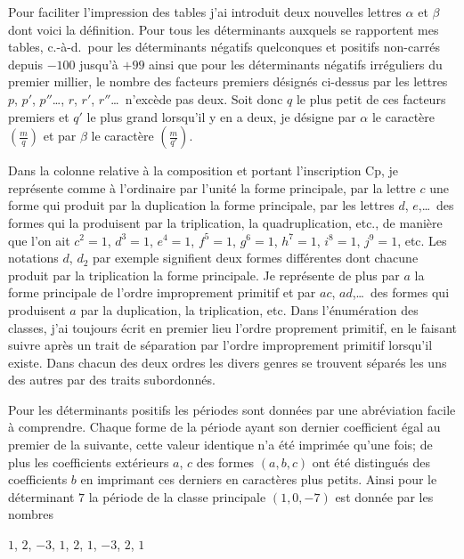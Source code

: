 \documentclass[11pt,a4paper]{article}
\begin{document}
Pour faciliter l'impression des tables j'ai introduit deux nouvelles lettres $\alpha$ et $\beta$ dont voici la d\'{e}finition. Pour tous les d\'{e}terminants auxquels se rapportent mes tables, c.-\`{a}-d.\ pour les d\'{e}terminants n\'{e}gatifs quelconques et positifs non-carr\'{e}s depuis $-100$ jusqu'\`{a} $+99$ ainsi que pour les d\'{e}terminants n\'{e}gatifs irr\'{e}guliers du premier millier, le nombre des facteurs premiers d\'{e}sign\'{e}s ci-dessus par les lettres $p$, $p'$, $p''$\ldots, $r$, $r'$, $r''$\ldots\ n'exc\`{e}de pas deux. Soit donc $q$ le plus petit de ces facteurs premiers et $q'$ le plus grand lorsqu'il y en a deux, je d\'{e}signe par $\alpha$ le caract\`{e}re $\left(\frac{m}{q}\right)$ et par $\beta$ le caract\`{e}re $\left(\frac{m}{q'}\right)$.

Dans la colonne relative \`{a} la composition et portant l'inscription Cp, je repr\'{e}sente comme \`{a} l'ordinaire par l'unit\'{e} la forme principale, par la lettre $c$ une forme qui produit par la duplication la forme principale, par les lettres $d$, $e$,\ldots\ des formes qui la produisent par la triplication, la quadruplication, etc., de mani\`{e}re que l'on ait $c^2=1$, $d^3=1$, $e^4=1$, $f^5=1$, $g^6=1$, $h^7=1$, $i^8=1$, $j^9=1$, etc. Les notations $d$, $d_2$ par exemple signifient deux formes diff\'{e}rentes dont chacune produit par la triplication la forme principale. Je repr\'{e}sente de plus par $a$ la forme principale de l'ordre improprement primitif et par $ac$, $ad$,\ldots\ des formes qui produisent $a$ par la duplication, la triplication, etc. Dans l'\'{e}num\'{e}ration des classes, j'ai toujours \'{e}crit en premier lieu l'ordre proprement primitif, en le faisant suivre apr\`{e}s un trait de s\'{e}paration par l'ordre improprement primitif lorsqu'il existe. Dans chacun des deux ordres les divers genres se trouvent s\'{e}par\'{e}s les uns des autres par des traits subordonn\'{e}s.

Pour les d\'{e}terminants positifs les p\'{e}riodes sont donn\'{e}es par une abr\'{e}viation facile \`{a} comprendre. Chaque forme de la p\'{e}riode ayant son dernier coefficient \'{e}gal au premier de la suivante, cette valeur identique n'a \'{e}t\'{e} imprim\'{e}e qu'une fois; de plus les coefficients ext\'{e}rieurs $a$, $c$ des formes $(a,b,c)$ ont \'{e}t\'{e} distingu\'{e}s des coefficients $b$ en imprimant ces derniers en caract\`{e}res plus petits. Ainsi pour le d\'{e}terminant $7$ la p\'{e}riode de la classe principale $(1,0,-7)$ est donn\'{e}e par les nombres

\begin{center}
$1$, $2$, $-3$, $1$, $2$, $1$, $-3$, $2$, $1$
\end{center}
\end{document}
